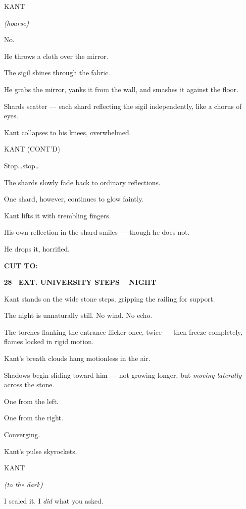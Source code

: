 \documentclass[12pt]{article}
\newcommand{\scene}[2]{%
  \vspace{1.8\baselineskip}%
  \noindent\textbf{#1 \ #2}\par\vspace{0.4\baselineskip}%
}
\newenvironment{dialogue}[1]{%
  \vspace{0.8\baselineskip}%
  \noindent\hspace*{2.3in}\textsc{#1}\par%
  \noindent\hspace*{1.5in}\begin{minipage}[t]{4.5in}%
}{%
  \end{minipage}\par%
}
\newcommand{\paren}[1]{%
  \noindent\hspace*{1.8in}\textit{(#1)}\par%
}
\newcommand{\transition}[1]{%
  \vspace{0.6\baselineskip}%
  \begin{flushright}\textbf{#1}\end{flushright}%
}
\begin{document}
\begin{dialogue}{KANT}
\paren{hoarse}
No.
\end{dialogue}

He throws a cloth over the mirror.

The sigil shines through the fabric.

He grabs the mirror, yanks it from the wall, and smashes it against the
floor.

Shards scatter — each shard reflecting the sigil independently, like a
chorus of eyes.

Kant collapses to his knees, overwhelmed.

\begin{dialogue}{KANT (CONT'D)}
Stop\ldots stop\ldots
\end{dialogue}

The shards slowly fade back to ordinary reflections.

One shard, however, continues to glow faintly.

Kant lifts it with trembling fingers.

His own reflection in the shard smiles — though he does not.

He drops it, horrified.

\transition{CUT TO:}


\scene{28}{EXT. UNIVERSITY STEPS -- NIGHT}

Kant stands on the wide stone steps, gripping the railing for support.

The night is unnaturally still. No wind. No echo.

The torches flanking the entrance flicker once, twice — then freeze
completely, flames locked in rigid motion.

Kant’s breath clouds hang motionless in the air.

Shadows begin sliding toward him — not growing longer, but \emph{moving
laterally} across the stone.

One from the left.

One from the right.

Converging.

Kant’s pulse skyrockets.

\begin{dialogue}{KANT}
\paren{to the dark}
I sealed it. I \emph{did} what you asked.
\end{dialogue}
\end{document}
